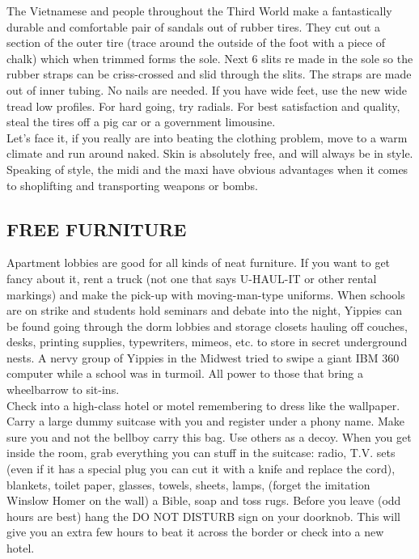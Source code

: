 \documentclass[11pt,twoside,a4paper]{book}
\begin{document}
The Vietnamese and people throughout the Third World make a fantastically durable and comfortable pair of sandals out of rubber tires. They cut out a section of the outer tire (trace around the outside of the foot with a piece of chalk) which when trimmed forms the sole. Next 6 slits re made in the sole so the rubber straps can be criss-crossed and slid through the slits. The straps are made out of inner tubing. No nails are needed. If you have wide feet, use the new wide tread low profiles. For hard going, try radials. For best satisfaction and quality, steal the tires off a pig car or a government limousine.~\\

Let's face it, if you really are into beating the clothing problem, move to a warm climate and run around naked. Skin is absolutely free, and will always be in style. Speaking of style, the midi and the maxi have obvious advantages when it comes to shoplifting and transporting weapons or bombs.~\\

\subsection{FREE FURNITURE}

Apartment lobbies are good for all kinds of neat furniture. If you want to get fancy about it, rent a truck (not one that says U-HAUL-IT or other rental markings) and make the pick-up with moving-man-type uniforms. When schools are on strike and students hold seminars and debate into the night, Yippies can be found going through the dorm lobbies and storage closets hauling off couches, desks, printing supplies, typewriters, mimeos, etc. to store in secret underground nests. A nervy group of Yippies in the Midwest tried to swipe a giant IBM 360 computer while a school was in turmoil. All power to those that bring a wheelbarrow to sit-ins.~\\

Check into a high-class hotel or motel remembering to dress like the wallpaper. Carry a large dummy suitcase with you and register under a phony name. Make sure you and not the bellboy carry this bag. Use others as a decoy. When you get inside the room, grab everything you can stuff in the suitcase: radio, T.V. sets (even if it has a special plug you can cut it with a knife and replace the cord), blankets, toilet paper, glasses, towels, sheets, lamps, (forget the imitation Winslow Homer on the wall) a Bible, soap and toss rugs. Before you leave (odd hours are best) hang the DO NOT DISTURB sign on your doorknob. This will give you an extra few hours to beat it across the border or check into a new hotel.~\\
\end{document}
